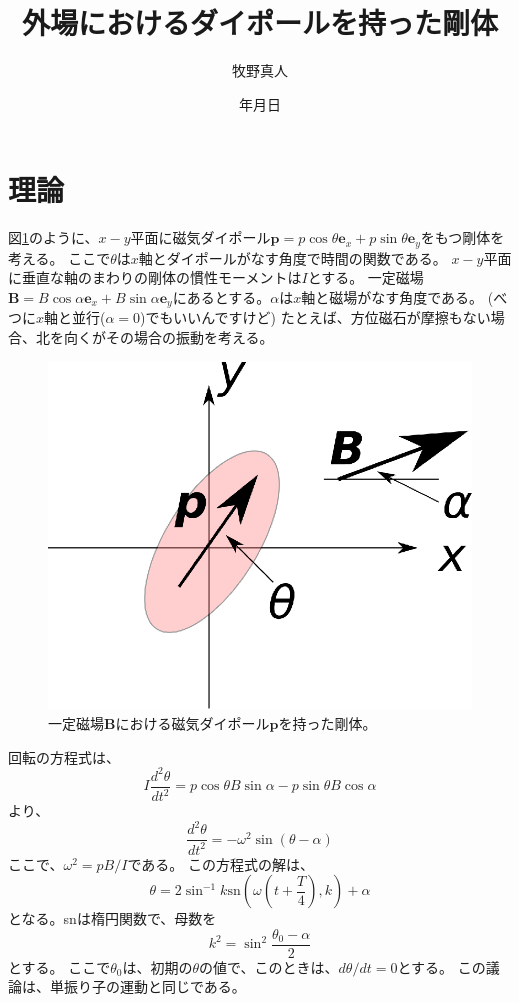 \documentclass[a4paper,11pt]{jarticle}
\title{外場におけるダイポールを持った剛体}
\author{牧野真人}
\date{\number\year 年\number\month 月\number\day 日}
\begin{document}
\maketitle
\section{理論}
図\ref{fig:system}のように、$x-y$平面に磁気ダイポール$\bm{p}=p\cos\theta\bm{e}_x+p\sin\theta\bm{e}_y$をもつ剛体を考える。
ここで$\theta$は$x$軸とダイポールがなす角度で時間の関数である。
$x-y$平面に垂直な軸のまわりの剛体の慣性モーメントは$I$とする。
一定磁場$\bm{B}=B\cos\alpha\bm{e}_x+B\sin\alpha\bm{e}_y$にあるとする。$\alpha$は$x$軸と磁場がなす角度である。
(べつに$x$軸と並行($\alpha=0$)でもいいんですけど)
たとえば、方位磁石が摩擦もない場合、北を向くがその場合の振動を考える。
\begin{figure}[h]
\centering
  \includegraphics[clip,width=0.7\linewidth]{system.eps}
  \caption{一定磁場$\bm{B}$における磁気ダイポール$\bm{p}$を持った剛体。
  }
  \label{fig:system}
\end{figure}

回転の方程式は、
\begin{equation}
I\frac{d^2\theta}{dt^2}=p\cos\theta B\sin\alpha-p\sin\theta B\cos\alpha
\label{eq:basic}
\end{equation}
より、
\begin{equation}
\frac{d^2\theta}{dt^2}=-\omega^2\sin(\theta-\alpha)
\end{equation}
ここで、$\omega^2=pB/I$である。
この方程式の解は、
\begin{equation}
\theta=2\sin^{-1}k\mbox{sn}\left(\omega\left(t+\frac{T}{4}\right),k\right)+\alpha
\end{equation}
となる。snは楕円関数で、母数を
\begin{equation}
k^2=\sin^2\frac{\theta_0-\alpha}{2}
\end{equation}
とする。
ここで$\theta_0$は、初期の$\theta$の値で、このときは、$d\theta/dt=0$とする。
この議論は、単振り子の運動と同じである。
\end{document}
